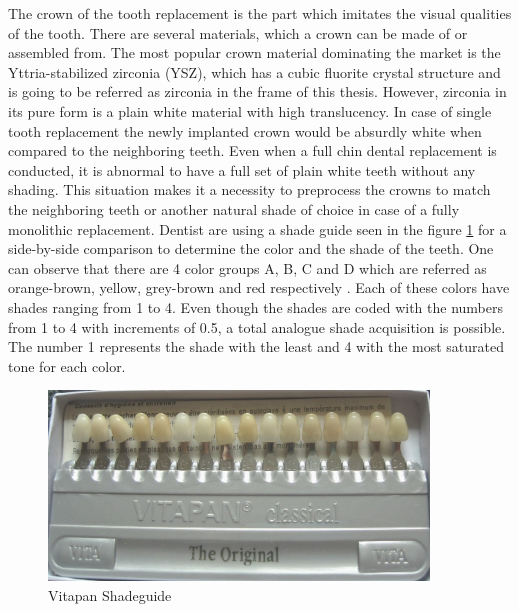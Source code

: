 \bigskip

 
 The crown of the tooth replacement is the part which imitates the visual qualities of the tooth. There are several materials, which a crown can be made of or assembled from. The most popular crown material dominating the market is the Yttria-stabilized zirconia (YSZ), which has a cubic fluorite crystal structure and is going to be referred as zirconia in the frame of this thesis. However, zirconia in its pure form is a plain white material with high translucency. In case of single tooth replacement the newly implanted crown would be absurdly white when compared to the neighboring teeth. Even when a full chin dental replacement is conducted, it is abnormal to have a full set of plain white teeth without any shading. This situation makes it a necessity to preprocess the crowns to match the neighboring teeth or another natural shade of choice in case of a fully monolithic replacement. Dentist are using a shade guide seen in the figure \ref{fig:shadeguide} for a side-by-side comparison to determine the color and the shade of the teeth. One can observe that there are 4 color groups A, B, C and D which are referred as orange-brown, yellow, grey-brown and red respectively \citep{vita}. Each of these colors have shades ranging from 1 to 4. Even though the shades are coded with the numbers from 1 to 4 with increments of 0.5, a total analogue shade acquisition is possible. The number 1 represents the shade with the least and 4 with the most saturated tone for each color.

\bigskip

 \begin{figure}[H]
 	\centering
 	\includegraphics[width=0.9\textwidth]{grafiken/shadeguide.jpg}
 	\caption{Vitapan Shadeguide}
 	\label{fig:shadeguide}
 \end{figure}  
  
 \bigskip
 


